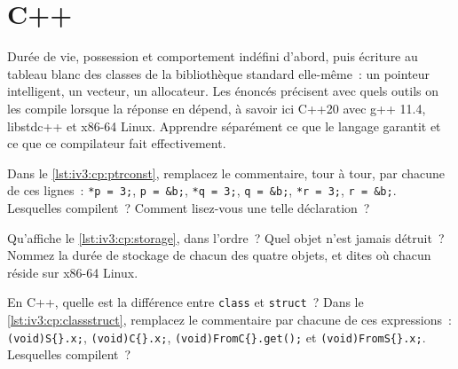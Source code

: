 \chapter{C++}\label{ch:iv3:cpp}

\begin{ivtrains}
Durée de vie, possession et comportement indéfini d'abord, puis écriture au tableau blanc des classes de la bibliothèque standard elle-même~: un pointeur intelligent, un vecteur, un allocateur. Les énoncés précisent avec quels outils on les compile lorsque la réponse en dépend, à savoir ici C++20 avec g++ 11.4, libstdc++ et x86-64 Linux. Apprendre séparément ce que le langage garantit et ce que ce compilateur fait effectivement.
\end{ivtrains}

\begin{question}\label{iq:iv3:cpp:1}
Dans le \cref{lst:iv3:cp:ptrconst}, remplacez le commentaire, tour à tour, par chacune de ces lignes~: \texttt{*p = 3;}, \texttt{p = \&b;}, \texttt{*q = 3;}, \texttt{q = \&b;}, \texttt{*r = 3;}, \texttt{r = \&b;}. Lesquelles compilent~? Comment lisez-vous une telle déclaration~?
\label{lst:iv3:cp:ptrconst}
\end{question}

\begin{question}\label{iq:iv3:cpp:2}
Qu'affiche le \cref{lst:iv3:cp:storage}, dans l'ordre~? Quel objet n'est jamais détruit~? Nommez la durée de stockage de chacun des quatre objets, et dites où chacun réside sur x86-64 Linux.
\label{lst:iv3:cp:storage}
\end{question}

\begin{question}\label{iq:iv3:cpp:3}
En C++, quelle est la différence entre \texttt{class} et \texttt{struct}~? Dans le \cref{lst:iv3:cp:classstruct}, remplacez le commentaire par chacune de ces expressions~: \texttt{(void)S\{\}.x;}, \texttt{(void)C\{\}.x;}, \texttt{(void)FromC\{\}.get();} et \texttt{(void)FromS\{\}.x;}. Lesquelles compilent~?
\label{lst:iv3:cp:classstruct}
\end{question}

